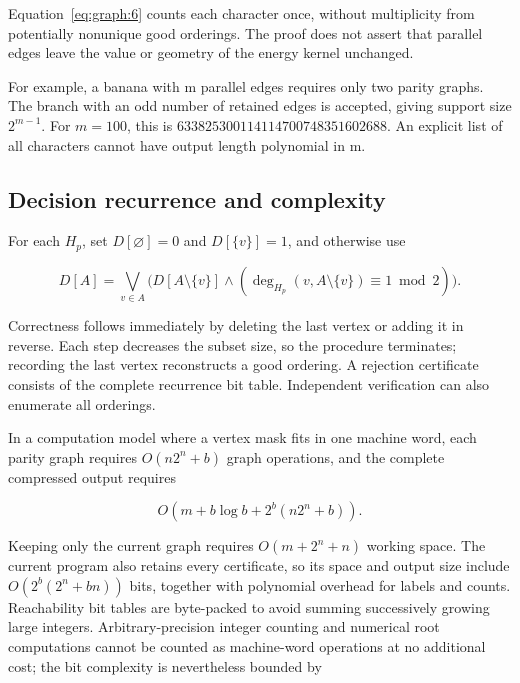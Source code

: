 \documentclass[11pt,a4paper,oneside]{article}
\theoremstyle{plain}
\theoremstyle{definition}
\theoremstyle{remark}
\numberwithin{equation}{section}
\begin{document}
Equation~\eqref{eq:graph:6} counts each character once, without multiplicity from potentially nonunique good orderings. The proof does not assert that parallel edges leave the value or geometry of the energy kernel unchanged.

For example, a banana with m parallel edges requires only two parity graphs. The branch with an odd number of retained edges is accepted, giving support size \(2^{m-1}\). For \(m=100\), this is \(633825300114114700748351602688\). An explicit list of all characters cannot have output length polynomial in m.


\subsection{Decision recurrence and complexity}\label{sec:graph:4}

For each \(H_p\), set \(D[\varnothing]=0\) and \(D[\{v\}]=1\), and otherwise use

\begin{equation}
D[A]=\bigvee_{v\in A}
   \bigl(D[A\setminus\{v\}]
     \land(\deg_{H_p}(v,A\setminus\{v\})\equiv1\bmod2)\bigr). \label{eq:graph:8}
\end{equation}

Correctness follows immediately by deleting the last vertex or adding it in reverse. Each step decreases the subset size, so the procedure terminates; recording the last vertex reconstructs a good ordering. A rejection certificate consists of the complete recurrence bit table. Independent verification can also enumerate all orderings.

In a computation model where a vertex mask fits in one machine word, each parity graph requires \(O(n2^n+b)\) graph operations, and the complete compressed output requires

\begin{equation}
O(m+b\log b+2^b(n2^n+b)).
\end{equation}

Keeping only the current graph requires \(O(m+2^n+n)\) working space. The current program also retains every certificate, so its space and output size include \(O(2^b(2^n+bn))\) bits, together with polynomial overhead for labels and counts. Reachability bit tables are byte-packed to avoid summing successively growing large integers. Arbitrary-precision integer counting and numerical root computations cannot be counted as machine-word operations at no additional cost; the bit complexity is nevertheless bounded by
\end{document}
